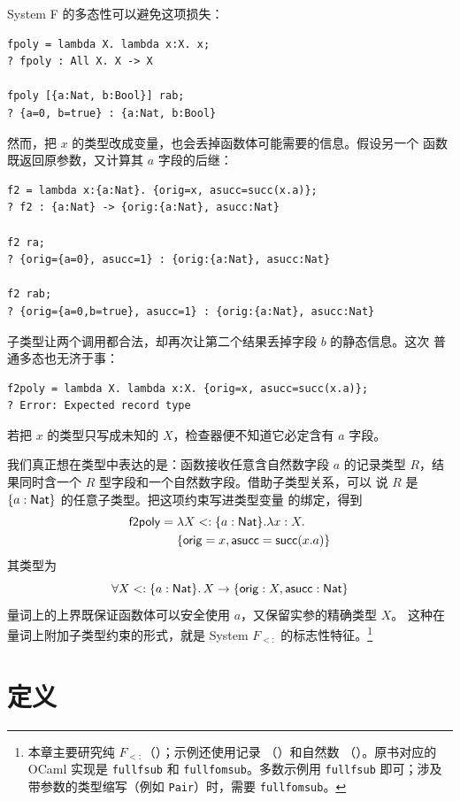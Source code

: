 System F 的多态性可以避免这项损失：
\begin{lstlisting}
fpoly = lambda X. lambda x:X. x;
? fpoly : All X. X -> X

fpoly [{a:Nat, b:Bool}] rab;
? {a=0, b=true} : {a:Nat, b:Bool}
\end{lstlisting}
然而，把 \(x\) 的类型改成变量，也会丢掉函数体可能需要的信息。假设另一个
函数既返回原参数，又计算其 \(a\) 字段的后继：
\begin{lstlisting}
f2 = lambda x:{a:Nat}. {orig=x, asucc=succ(x.a)};
? f2 : {a:Nat} -> {orig:{a:Nat}, asucc:Nat}

f2 ra;
? {orig={a=0}, asucc=1} : {orig:{a:Nat}, asucc:Nat}

f2 rab;
? {orig={a=0,b=true}, asucc=1} : {orig:{a:Nat}, asucc:Nat}
\end{lstlisting}
子类型让两个调用都合法，却再次让第二个结果丢掉字段 \(b\) 的静态信息。这次
普通多态也无济于事：
\begin{lstlisting}
f2poly = lambda X. lambda x:X. {orig=x, asucc=succ(x.a)};
? Error: Expected record type
\end{lstlisting}
若把 \(x\) 的类型只写成未知的 \(X\)，检查器便不知道它必定含有 \(a\) 字段。

我们真正想在类型中表达的是：函数接收任意含自然数字段 \(a\) 的记录类型
\(R\)，结果同时含一个 \(R\) 型字段和一个自然数字段。借助子类型关系，可以
说 \(R\) 是 \(\{a:\mathsf{Nat}\}\) 的任意子类型。把这项约束写进类型变量
的绑定，得到
\[
\begin{aligned}
\mathsf{f2poly}
={}&\lambda X<:\{a:\mathsf{Nat}\}.\lambda x:X.\\
&\{\mathsf{orig}=x,
\mathsf{asucc}=\mathsf{succ}(x.a)\}
\end{aligned}
\]
其类型为
\[
\forall X<:\{a:\mathsf{Nat}\}.\,
X\to\{\mathsf{orig}:X,\mathsf{asucc}:\mathsf{Nat}\}
\]
量词上的上界既保证函数体可以安全使用 \(a\)，又保留实参的精确类型 \(X\)。
这种在量词上附加子类型约束的形式，就是 System \(F_{<:}\) 的标志性特征。\footnote{本章主要研究纯
\(F_{<:}\)（）；示例还使用记录
（）和自然数
（）。原书对应的 OCaml 实现是
\texttt{fullfsub} 和 \texttt{fullfomsub}。多数示例用 \texttt{fullfsub}
即可；涉及带参数的类型缩写（例如 \texttt{Pair}）时，需要
\texttt{fullfomsub}。}

\section{定义}
\label{sec:26.2}

